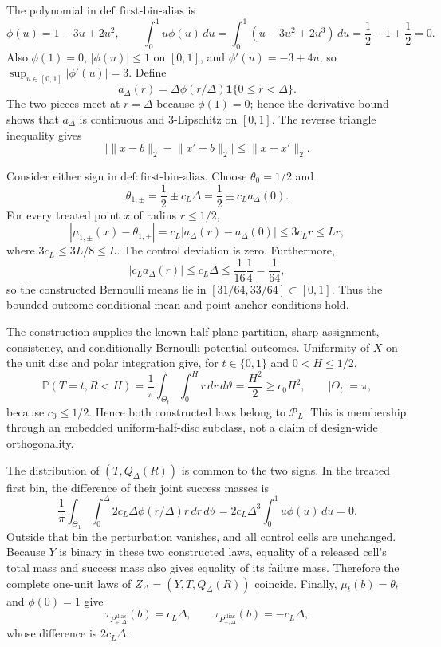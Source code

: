 The polynomial in \(\mathrm{def:first\text{-}bin\text{-}alias}\) is
\[
 \phi(u)=1-3u+2u^2,
 \qquad
 \int_0^1u\phi(u)\,du
 =\int_0^1(u-3u^2+2u^3)\,du
 =\frac12-1+\frac12=0.
\]
Also \(\phi(1)=0\), \(|\phi(u)|\leq1\) on \([0,1]\), and \(\phi'(u)=-3+4u\), so \(\sup_{u\in[0,1]}|\phi'(u)|=3\).  Define
\[
 a_\Delta(r)=\Delta\phi(r/\Delta)\mathbf1\{0\leq r<\Delta\}.
\]
The two pieces meet at \(r=\Delta\) because \(\phi(1)=0\); hence the derivative bound shows that \(a_\Delta\) is continuous and \(3\)-Lipschitz on \([0,1]\).  The reverse triangle inequality gives
\[
 \bigl|\lVert x-b\rVert_2-\lVert x'-b\rVert_2\bigr|
 \leq\lVert x-x'\rVert_2.
\]

Consider either sign in \(\mathrm{def:first\text{-}bin\text{-}alias}\).  Choose \(\theta_0=1/2\) and
\[
 \theta_{1,\pm}=\frac12\pm c_L\Delta
 =\frac12\pm c_La_\Delta(0).
\]
For every treated point \(x\) of radius \(r\leq1/2\),
\[
 |\mu_{1,\pm}(x)-\theta_{1,\pm}|
 =c_L|a_\Delta(r)-a_\Delta(0)|
 \leq3c_Lr
 \leq Lr,
\]
where \(3c_L\leq3L/8\leq L\).  The control deviation is zero.  Furthermore,
\[
 |c_La_\Delta(r)|\leq c_L\Delta
 \leq\frac1{16}\frac14=\frac1{64},
\]
so the constructed Bernoulli means lie in \([31/64,33/64]\subset[0,1]\).  Thus the bounded-outcome conditional-mean and point-anchor conditions hold.

The construction supplies the known half-plane partition, sharp assignment, consistency, and conditionally Bernoulli potential outcomes.  Uniformity of \(X\) on the unit disc and polar integration give, for \(t\in\{0,1\}\) and \(0<H\leq1/2\),
\[
 \mathbb P(T=t,R<H)
 =\frac1\pi\int_{\Theta_t}\int_0^H r\,dr\,d\vartheta
 =\frac{H^2}{2}
 \geq c_0H^2,
 \qquad |\Theta_t|=\pi,
\]
because \(c_0\leq1/2\).  Hence both constructed laws belong to \(\mathcal P_L\).  This is membership through an embedded uniform-half-disc subclass, not a claim of design-wide orthogonality.

The distribution of \((T,Q_\Delta(R))\) is common to the two signs.  In the treated first bin, the difference of their joint success masses is
\[
 \frac1\pi\int_{\Theta_1}\int_0^\Delta
 2c_L\Delta\phi(r/\Delta)r\,dr\,d\vartheta
 =2c_L\Delta^3\int_0^1u\phi(u)\,du=0.
\]
Outside that bin the perturbation vanishes, and all control cells are unchanged.  Because \(Y\) is binary in these two constructed laws, equality of a released cell's total mass and success mass also gives equality of its failure mass.  Therefore the complete one-unit laws of \(Z_\Delta=(Y,T,Q_\Delta(R))\) coincide.  Finally, \(\mu_t(b)=\theta_t\) and \(\phi(0)=1\) give
\[
 \tau_{P^{\mathrm{alias}}_{+,\Delta}}(b)=c_L\Delta,
 \qquad
 \tau_{P^{\mathrm{alias}}_{-,\Delta}}(b)=-c_L\Delta,
\]
whose difference is \(2c_L\Delta\).